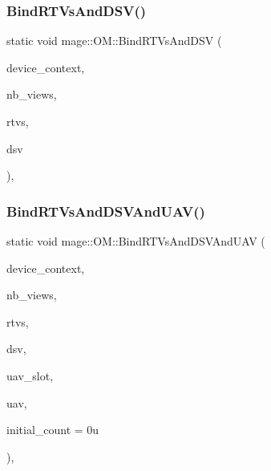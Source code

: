 \subsubsection{\texorpdfstring{Bind\+R\+T\+Vs\+And\+D\+S\+V()}{BindRTVsAndDSV()}}
{\footnotesize\ttfamily static void mage\+::\+O\+M\+::\+Bind\+R\+T\+Vs\+And\+D\+SV (\begin{DoxyParamCaption}\item[{I\+D3\+D11\+Device\+Context2 $\ast$}]{device\+\_\+context,  }\item[{U\+I\+NT}]{nb\+\_\+views,  }\item[{I\+D3\+D11\+Render\+Target\+View $\ast$const $\ast$}]{rtvs,  }\item[{I\+D3\+D11\+Depth\+Stencil\+View $\ast$}]{dsv }\end{DoxyParamCaption})\hspace{0.3cm}{\ttfamily [static]}, {\ttfamily [noexcept]}}

\hypertarget{structmage_1_1_o_m_a0cacb7ef07da3ce8124901c3db58be33}{}\label{structmage_1_1_o_m_a0cacb7ef07da3ce8124901c3db58be33} 
\subsubsection{\texorpdfstring{Bind\+R\+T\+Vs\+And\+D\+S\+V\+And\+U\+A\+V()}{BindRTVsAndDSVAndUAV()}}
{\footnotesize\ttfamily static void mage\+::\+O\+M\+::\+Bind\+R\+T\+Vs\+And\+D\+S\+V\+And\+U\+AV (\begin{DoxyParamCaption}\item[{I\+D3\+D11\+Device\+Context2 $\ast$}]{device\+\_\+context,  }\item[{U\+I\+NT}]{nb\+\_\+views,  }\item[{I\+D3\+D11\+Render\+Target\+View $\ast$const $\ast$}]{rtvs,  }\item[{I\+D3\+D11\+Depth\+Stencil\+View $\ast$}]{dsv,  }\item[{U\+I\+NT}]{uav\+\_\+slot,  }\item[{I\+D3\+D11\+Unordered\+Access\+View $\ast$}]{uav,  }\item[{U\+I\+NT}]{initial\+\_\+count = {\ttfamily 0u} }\end{DoxyParamCaption})\hspace{0.3cm}{\ttfamily [static]}, {\ttfamily [noexcept]}}

